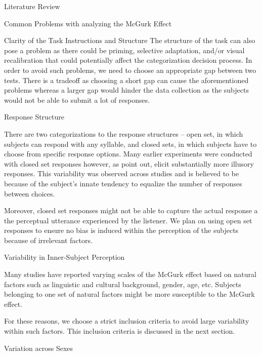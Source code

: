 \documentclass{article}
\begin{document}
\begin{psection}{Literature Review}
\begin{psubsection}{Common Problems with analyzing the McGurk Effect}
\begin{pssubsection}{Clarity of the Task Instructions and Structure}
			The structure of the task can also pose a problem as there could be priming, selective adaptation, and/or visual recalibration that could potentially affect the categorization decision process. In order to avoid such problems, we need to choose an appropriate gap between two tests. There is a tradeoff as choosing a short gap can cause the aforementioned problems whereas a larger gap would hinder the data collection as the subjects would not be able to submit a lot of responses.

		\end{pssubsection}

		\begin{pssubsection}{Response Structure}

			There are two categorizations to the response structures -- open set, in which subjects can respond with any syllable, and closed sets, in which subjects have to choose from specific response options. Many earlier experiments were conducted with closed set responses however, as \cite{40-years} point out, elicit substantially more illusory responses. This variability was observed across studies and is believed to be because of the subject's innate tendency to equalize the number of responses between choices.

			Moreover, closed set responses might not be able to capture the actual response a the perceptual utterance experienced by the listener. We plan on using open set responses to ensure no bias is induced within the perception of the subjects because of irrelevant factors.

		\end{pssubsection}

		\begin{pssubsection}{Variability in Inner-Subject Perception}

			Many studies have reported varying scales of the McGurk effect based on natural factors such as linguistic and cultural background, gender, age, etc. Subjects belonging to one set of natural factors might be more susceptible to the McGurk effect.

			For these reasons, we choose a strict inclusion criteria to avoid large variability within such factors. This inclusion criteria is discussed in the next section.

		\end{pssubsection}

	\end{psubsection}

	\begin{psubsection}{Variation across Sexes}


\end{psubsection}
\end{psection}
\end{document}
